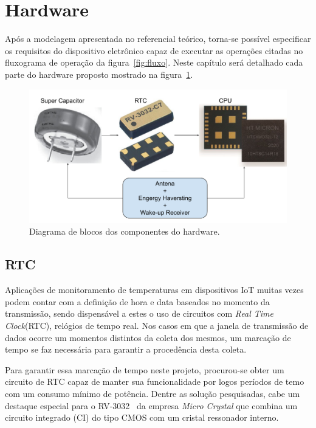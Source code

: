 \section{Hardware}
Após a modelagem apresentada no referencial teórico, torna-se possível especificar os requisitos do dispositivo eletrônico capaz de executar as operações citadas no fluxograma de operação da figura~\ref{fig:fluxo}. Neste capítulo será detalhado cada parte do hardware proposto mostrado na figura~\ref{fig:sistema}.

\begin{figure}
  \caption{Diagrama de blocos dos componentes do hardware.}
  \begin{center}
      \includegraphics[scale=0.7]{img/sistema.pdf}
  \end{center}
  \label{fig:sistema}
\end{figure}
\subsection{RTC}
Aplicações de monitoramento de temperaturas em dispositivos IoT muitas vezes~\cite{Soh} podem contar com a definição de hora e data baseados no momento da transmissão, sendo dispensável a estes o uso de circuitos com \textit{Real Time Clock}(RTC), relógios de tempo real. Nos casos em que a janela de transmissão de dados ocorre um momentos distintos da coleta dos mesmos, um marcação de tempo se faz necessária para garantir a procedência desta coleta.

Para garantir essa marcação de tempo neste projeto, procurou-se obter um circuito de RTC capaz de manter sua funcionalidade por logos períodos de temo com um consumo mínimo de potência. Dentre as solução pesquisadas, cabe um destaque especial para o RV-3032~\cite{rtc} da empresa \textit{Micro Crystal} que combina um circuito integrado (CI) do tipo CMOS com um cristal ressonador interno. 


